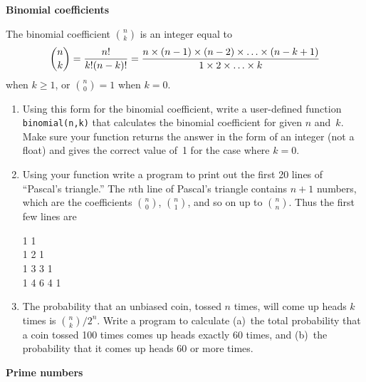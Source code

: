 \documentclass[12pt]{article}
\begin{document}
\begin{exercises}

\exercise \textbf{Binomial coefficients}

\exskip The binomial coefficient ${n\choose k}$ is an integer equal to
\begin{displaymath}
{n\choose k} = {n!\over k!(n-k)!}
  = {n\times(n-1)\times(n-2)\times\ldots\times(n-k+1)\over
     1\times2\times\ldots\times k}
\end{displaymath}
when $k\ge1$, or ${n\choose0}=1$ when $k=0$.
\begin{enumerate}\setlength{\itemsep}{0pt}
\item Using this form for the binomial coefficient, write a user-defined
  function \verb|binomial(n,k)| that calculates the binomial coefficient
  for given $n$ and~$k$.  Make sure your function returns the answer in the
  form of an integer (not a float) and gives the correct value of~1 for the
  case where $k=0$.
\item Using your function write a program to print out the first 20 lines
  of ``Pascal's triangle.''  The $n$th line of Pascal's triangle contains
  $n+1$ numbers, which are the coefficients ${n\choose 0}$, ${n\choose1}$,
  and so on up to ${n\choose n}$.  Thus the first few lines are
\begin{flushleft}
1 1 \\
1 2 1 \\
1 3 3 1 \\
1 4 6 4 1
\end{flushleft}
\item The probability that an unbiased coin, tossed $n$ times, will come up
  heads $k$ times is ${n\choose k}/2^n$.  Write a program to calculate
  (a)~the total probability that a coin tossed 100 times comes up heads
  exactly 60 times, and (b)~the probability that it comes up heads 60 or
  more times.
\end{enumerate}



\exercise \textbf{Prime numbers}


\end{exercises}
\end{document}
